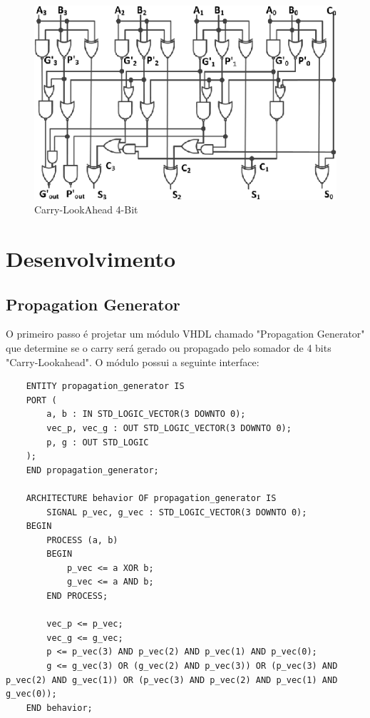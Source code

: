 \documentclass[12pt]{article}
\begin{document}
\begin{figure}
    \centering
    \includegraphics[scale=0.75]{figures/cla-4bit.png}
    \caption{Carry-LookAhead 4-Bit}
    \label{fig:cla-4bit}
\end{figure}

\section{Desenvolvimento}

\subsection{Propagation Generator}

O primeiro passo é projetar um módulo VHDL chamado "Propagation Generator" que determine se o carry será gerado ou propagado pelo somador de 4 bits "Carry-Lookahead". O módulo possui a seguinte interface:

\begin{lstlisting}
    ENTITY propagation_generator IS
    PORT (
        a, b : IN STD_LOGIC_VECTOR(3 DOWNTO 0);
        vec_p, vec_g : OUT STD_LOGIC_VECTOR(3 DOWNTO 0);
        p, g : OUT STD_LOGIC
    );
    END propagation_generator;
    
    ARCHITECTURE behavior OF propagation_generator IS
        SIGNAL p_vec, g_vec : STD_LOGIC_VECTOR(3 DOWNTO 0);
    BEGIN
        PROCESS (a, b)
        BEGIN
            p_vec <= a XOR b;
            g_vec <= a AND b;
        END PROCESS;
    
        vec_p <= p_vec;
        vec_g <= g_vec;
        p <= p_vec(3) AND p_vec(2) AND p_vec(1) AND p_vec(0);
        g <= g_vec(3) OR (g_vec(2) AND p_vec(3)) OR (p_vec(3) AND p_vec(2) AND g_vec(1)) OR (p_vec(3) AND p_vec(2) AND p_vec(1) AND g_vec(0));
    END behavior;
\end{lstlisting}
\end{document}
